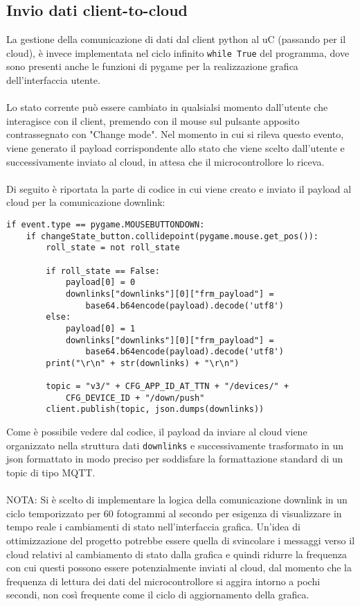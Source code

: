 \subsection{Invio dati client-to-cloud}
La gestione della comunicazione di dati dal client python al uC (passando per il cloud), è invece implementata nel ciclo infinito \Verb|while True| 
del programma, dove sono presenti anche le funzioni di pygame per la realizzazione grafica dell'interfaccia utente.
\\\\Lo stato corrente può essere cambiato in qualsialsi momento dall'utente che interagisce con il client, premendo con il mouse sul pulsante
apposito contrassegnato con "Change mode". Nel momento in cui si rileva questo evento, viene generato il payload corrispondente allo stato che viene 
scelto dall'utente e successivamente inviato al cloud, in attesa che il microcontrollore lo riceva.
\\\\Di seguito è riportata la parte di codice in cui viene creato e inviato il payload al cloud per la comunicazione downlink:
\begin{verbatim}
if event.type == pygame.MOUSEBUTTONDOWN:
    if changeState_button.collidepoint(pygame.mouse.get_pos()):
        roll_state = not roll_state

        if roll_state == False:
            payload[0] = 0
            downlinks["downlinks"][0]["frm_payload"] = 
                base64.b64encode(payload).decode('utf8')
        else:
            payload[0] = 1
            downlinks["downlinks"][0]["frm_payload"] = 
                base64.b64encode(payload).decode('utf8')
        print("\r\n" + str(downlinks) + "\r\n")

        topic = "v3/" + CFG_APP_ID_AT_TTN + "/devices/" + 
            CFG_DEVICE_ID + "/down/push"
        client.publish(topic, json.dumps(downlinks))
\end{verbatim}
Come è possibile vedere dal codice, il payload da inviare al cloud viene organizzato nella struttura dati \Verb|downlinks| e successivamente trasformato in un json
formattato in modo preciso per soddisfare la formattazione standard di un topic di tipo MQTT.\\\\
NOTA: Si è scelto di implementare la logica della comunicazione downlink in un ciclo temporizzato per 60 fotogrammi al secondo per esigenza di 
visualizzare in tempo reale i cambiamenti di stato nell'interfaccia grafica. Un'idea di ottimizzazione del progetto potrebbe essere
quella di svincolare i messaggi verso il cloud relativi al cambiamento di stato dalla grafica e quindi ridurre la frequenza con cui questi possono essere potenzialmente
inviati al cloud, dal momento che la frequenza di lettura dei dati del microcontrollore si aggira intorno a pochi secondi, non così frequente come il ciclo di aggiornamento della grafica.



